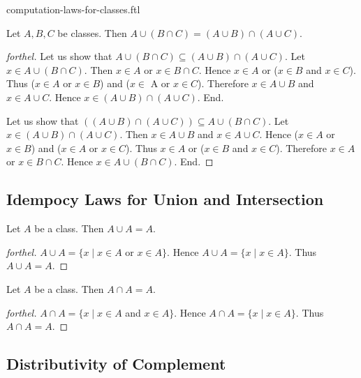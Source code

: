 \documentclass{naproche-library}
\begin{document}
\begin{smodule}{computation-laws-for-classes.ftl}
  \begin{proposition}[forthel,id=FOUNDATIONS_02_5937390721957888]
    Let $A, B, C$ be classes.
    Then $A \cup (B \cap C) = (A \cup B) \cap (A \cup C)$.
  \end{proposition}
  \begin{proof}[forthel]
    Let us show that $A \cup (B \cap C) \subseteq (A \cup B) \cap (A \cup C)$.
      Let $x \in A \cup (B \cap C)$.
      Then $x \in A$ or $x \in B \cap C$.
      Hence $x \in A$ or ($x \in B$ and $x \in C$).
      Thus ($x \in A$ or $x \in B$) and ($x \in$ A or $x \in C$).
      Therefore $x \in A \cup B$ and $x \in A \cup C$.
      Hence $x \in (A \cup B) \cap (A \cup C)$.
    End.

    Let us show that $((A \cup B) \cap (A \cup C)) \subseteq A \cup (B \cap C)$. %
      Let $x \in (A \cup B) \cap (A \cup C)$.
      Then $x \in A \cup B$ and $x \in A \cup C$.
      Hence ($x \in A$ or $x \in B$) and ($x \in A$ or $x \in C$).
      Thus $x \in A$ or ($x \in B$ and $x \in C$).
      Therefore $x \in A$ or $x \in B \cap C$.
      Hence $x \in A \cup (B \cap C)$.
    End.
  \end{proof}


  \subsection*{Idempocy Laws for Union and Intersection}

  \begin{proposition}[forthel,id=FOUNDATIONS_02_2096996737351680]
    Let $A$ be a class.
    Then $A \cup A = A$.
  \end{proposition}
  \begin{proof}[forthel]
    $A \cup A = \{x \mid x \in A$ or $x \in A \}$.
    Hence $A \cup A = \{ x \mid x \in A \}$.
    Thus $A \cup A = A$.
  \end{proof}

  \begin{proposition}[forthel,id=FOUNDATIONS_02_4053144145231872]
    Let $A$ be a class.
    Then $A \cap A = A$.
  \end{proposition}
  \begin{proof}[forthel]
    $A \cap A = \{ x \mid x \in A$ and $x \in A \}$.
    Hence $A \cap A = \{ x \mid x \in A \}$.
    Thus $A \cap A = A$.
  \end{proof}


  \subsection*{Distributivity of Complement}


\end{smodule}
\end{document}
